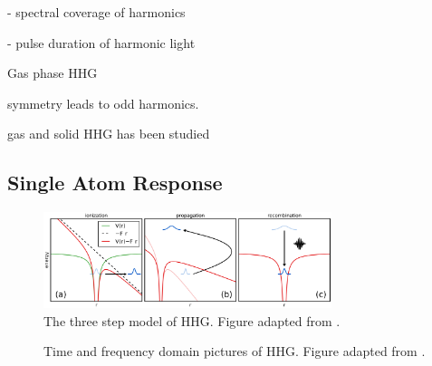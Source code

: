 - spectral coverage of harmonics

- pulse duration of harmonic light

Gas phase HHG 

symmetry leads to odd harmonics.

gas and solid HHG has been studied

\subsection{Single Atom Response}

\label{sec:single-atom-response}

\begin{figure}
	\centering
	\includegraphics[width=0.75\textwidth]{figures/chap1/ThreeStepModel.png}
	\caption{The three step model of HHG. Figure adapted from \cite{schounAttosecondHighHarmonicSpectroscopy2015}.}
	\label{fig:ThreeStepModel}
\end{figure}

\begin{figure}
	\centering
	\qquad
	\caption{Time and frequency domain pictures of HHG. Figure adapted from \cite{eichTimeAngleresolvedPhotoemission2014}.}
	\label{fig:APT_IR_field}
\end{figure}

